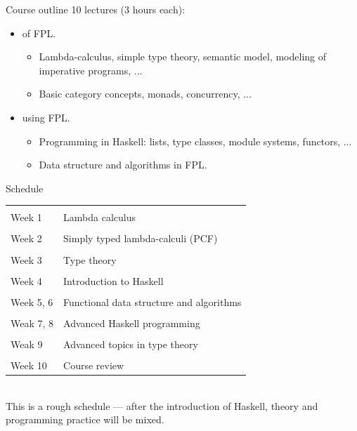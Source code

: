 \documentclass[paper=screen,mode=present,style=zysimple]{powerdot}
\begin{document}
\begin{slide}{Course outline}
10 lectures (3 hours each):
\begin{itemize}
\item {} of FPL.
\begin{itemize}
\item Lambda-calculus, simple type theory, semantic model, modeling of imperative programs, ...
\item Basic category concepts, monads, concurrency, ...
\end{itemize}
\item {} using FPL.
\begin{itemize}
\item Programming in Haskell: lists, type classes, module systems, functors, ...
\item Data structure and algorithms in FPL.
\end{itemize}
\end{itemize}
\end{slide}

\begin{slide}{Schedule}
\hspace*{4em}
\begin{tabular}[b]{l || l }
\hline \\[-0.8em]
Week 1 & Lambda calculus
\\[0.5em] \hline \\[-0.8em]
Week 2  & Simply typed lambda-calculi (PCF)
\\[0.5em] \hline \\[-0.8em]
Week 3 & Type theory 
\\[0.5em] \hline \\[-0.8em]
Week 4 & Introduction to Haskell 
\\[0.5em] \hline \\[-0.8em]
Week 5, 6 & Functional data structure and algorithms
\\[0.5em] \hline \\[-0.8em]
Weak 7, 8 & Advanced Haskell programming 
\\[0.5em] \hline \\[-0.8em]
Weak 9 & Advanced topics in type theory
\\[0.5em] \hline \\[-0.8em]
Week 10 & Course review
\\[0.5em] \hline 
\end{tabular}
\\
This is a rough schedule --- after the introduction of Haskell, theory and programming practice will be mixed.
\end{slide}
\end{document}
